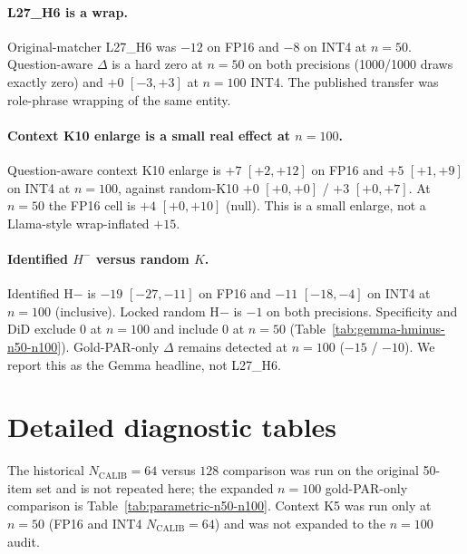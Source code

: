 \documentclass{article} %
\begin{document}
\paragraph{L27\_H6 is a wrap.}
Original-matcher L27\_H6 was $-12$ on FP16 and $-8$ on INT4 at $n{=}50$. Question-aware $\Delta$ is a hard zero at $n{=}50$ on both precisions (1000/1000 draws exactly zero) and $+0$ $[-3,+3]$ at $n{=}100$ INT4. The published transfer was role-phrase wrapping of the same entity.

\paragraph{Context K10 enlarge is a small real effect at $n{=}100$.}
Question-aware context K10 enlarge is $+7$ $[+2,+12]$ on FP16 and $+5$ $[+1,+9]$ on INT4 at $n{=}100$, against random-K10 $+0$ $[+0,+0]$ / $+3$ $[+0,+7]$. At $n{=}50$ the FP16 cell is $+4$ $[+0,+10]$ (null). This is a small enlarge, not a Llama-style wrap-inflated $+15$.

\paragraph{Identified $H^{-}$ versus random $K$.}
Identified H$-$ is $-19$ $[-27,-11]$ on FP16 and $-11$ $[-18,-4]$ on INT4 at $n{=}100$ (inclusive). Locked random H$-$ is $-1$ on both precisions. Specificity and DiD exclude 0 at $n{=}100$ and include 0 at $n{=}50$ (Table~\ref{tab:gemma-hminus-n50-n100}). Gold-PAR-only $\Delta$ remains detected at $n{=}100$ ($-15$ / $-10$). We report this as the Gemma headline, not L27\_H6.

\section{Detailed diagnostic tables}
\label{app:diagnostics}

The historical $N_{\mathrm{CALIB}}{=}64$ versus $128$ comparison was run on the original 50-item set and is not repeated here; the expanded $n{=}100$ gold-PAR-only comparison is Table~\ref{tab:parametric-n50-n100}. Context K5 was run only at $n{=}50$ (FP16 and INT4 $N_{\mathrm{CALIB}}{=}64$) and was not expanded to the $n{=}100$ audit.
\end{document}

